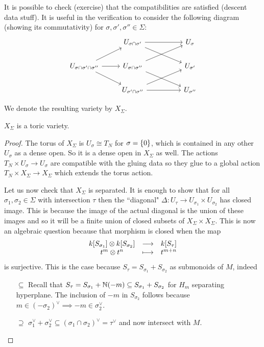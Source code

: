 It is possible to check (exercise) that the compatibilities are satisfied (descent data stuff). It is useful in the verification to consider the following diagram (showing its commutativity) for $\sigma,\sigma',\sigma''\in \Sigma$:
\[\begin{tikzcd}
	& {U_{\sigma\cap \sigma'}} && {U_\sigma} \\
	{U_{\sigma\cap \sigma'\cap \sigma''}} & {U_{\sigma\cap \sigma''}} && {U_{\sigma'}} \\
	& {U_{\sigma'\cap \sigma''}} && {U_{\sigma''}}
	\arrow[from=1-2, to=1-4]
	\arrow[from=1-2, to=2-4]
	\arrow[from=2-1, to=1-2]
	\arrow[from=2-1, to=2-2]
	\arrow[from=2-1, to=3-2]
	\arrow[from=2-2, to=1-4]
	\arrow[from=2-2, to=3-4]
	\arrow[from=3-2, to=2-4]
	\arrow[from=3-2, to=3-4]
\end{tikzcd}\]

We denote the resulting variety by $X_\Sigma$.


\begin{theorem}[]\label{ThToricVarietyFromFan}
$X_\Sigma$ is a toric variety.
\end{theorem}
\begin{proof}
The torus of $X_\Sigma$ is $U_\sigma\cong T_N$ for $\sigma=\left\{{0}\right\}$, which is contained in any other $U_\sigma$ as a dense open. So it is a dense open in $X_\Sigma$ as well. The actions $T_N\times U_\sigma\to U_\sigma$ are compatible with the gluing data so they glue to a global action $T_N\times X_\Sigma\to X_\Sigma$ which extends the torus action.

Let us now check that $X_\Sigma$ is separated. It is enough to show that for all $\sigma_1,\sigma_2\in \Sigma$ with intersection $\tau$ then the ``diagonal" $\Delta:U_\tau\to U_{\sigma_1}\times U_{\sigma_2}$ has closed image. This is because the image of the actual diagonal is the union of these images and so it will be a finite union of closed subsets of $X_\Sigma\times X_\Sigma$. This is now an algebraic question because that morphism is closed when the map
\[\begin{array}{ccc} {k[S_{\sigma_1}]\otimes k[S_{\sigma_2}]} & \longrightarrow & {k[S_\tau]}\\ {t^m\otimes t^n} & \longmapsto & {t^{m+n}} \end{array}\]
is surjective. This is the case because $S_\tau=S_{\sigma_1}+S_{\sigma_2}$ as submonoids of $M$, indeed
\setlength{\leftmargini}{0cm}
\begin{itemize}
\item[$\boxed{\subseteq}$] Recall that $S_\tau=S_{\sigma_1}+\mathbb{N}(-m)\subseteq S_{\sigma_1}+S_{\sigma_2}$ for $H_m$ separating hyperplane. The inclusion of $-m$ in $S_{\sigma_2}$ follows because $m\in (-\sigma_2)^\vee\implies -m\in \sigma_2^\vee$.
\item[$\boxed{\supseteq}$] $\sigma_1^\vee+\sigma_2^\vee\subseteq(\sigma_1\cap\sigma_2)^\vee=\tau^\vee$ and now intersect with $M$.
\end{itemize}
\setlength{\leftmargini}{0.5cm}
\end{proof}


